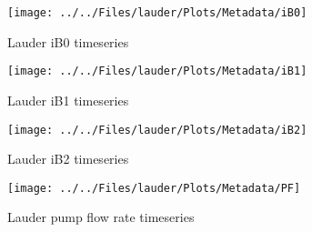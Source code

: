 
    \begin{figure}
        \centering
\texttt{[image: ../../Files/lauder/Plots/Metadata/iB0]}
    \caption{Lauder iB0 timeseries}
            \label{fig:iB0}
    \end{figure}

    \begin{figure}
        \centering
\texttt{[image: ../../Files/lauder/Plots/Metadata/iB1]}
    \caption{Lauder iB1 timeseries}
            \label{fig:iB1}
    \end{figure}

    \begin{figure}
        \centering
\texttt{[image: ../../Files/lauder/Plots/Metadata/iB2]}
    \caption{Lauder iB2 timeseries}
            \label{fig:iB2}
    \end{figure}

    \begin{figure}
        \centering
\texttt{[image: ../../Files/lauder/Plots/Metadata/PF]}
    \caption{Lauder pump flow rate timeseries}
            \label{fig:PF}
    \end{figure}



